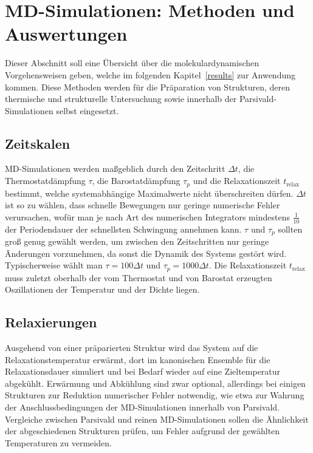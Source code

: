 \section{MD-Simulationen: Methoden und Auswertungen}
\label{mdmethods}

Dieser Abschnitt soll eine Übersicht über die molekulardynamischen Vorgehensweisen geben, welche im folgenden Kapitel~\ref{results} zur Anwendung kommen.
Diese Methoden werden für die Präparation von Strukturen, deren thermische und strukturelle Untersuchung sowie innerhalb der Parsivald-Simulationen selbst eingesetzt.

\subsection{Zeitskalen}

MD-Simulationen werden maßgeblich durch den Zeitschritt $\Delta t$, die Thermostatdämpfung $\tau$, die Barostatdämpfung $\tau_p$ und die Relaxationszeit $t_\text{relax}$ bestimmt, welche systemabhängige Maximalwerte nicht überschreiten dürfen.
$\Delta t$ ist so zu wählen, dass schnelle Bewegungen nur geringe numerische Fehler verursachen, wofür man je nach Art des numerischen Integrators mindestens $\frac{1}{10}$ der Periodendauer der schnellsten Schwingung annehmen kann.
$\tau$ und $\tau_p$ sollten groß genug gewählt werden, um zwischen den Zeitschritten nur geringe Änderungen vorzunehmen, da sonst die Dynamik des Systems gestört wird.
Typischerweise wählt man $\tau = 100 \Delta t$ und  $\tau_p = 1000 \Delta t$.
Die Relaxationszeit $t_\text{relax}$ muss zuletzt oberhalb der vom Thermostat und von Barostat erzeugten Oszillationen der Temperatur und der Dichte liegen.


\subsection{Relaxierungen}

Ausgehend von einer präparierten Struktur wird das System auf die Relaxationstemperatur erwärmt, dort im kanonischen Ensemble für die Relaxationsdauer simuliert und bei Bedarf wieder auf eine Zieltemperatur abgekühlt.
Erwärmung und Abkühlung sind zwar optional, allerdings bei einigen Strukturen zur Reduktion numerischer Fehler notwendig, wie etwa zur Wahrung der Anschlussbedingungen der MD-Simulationen innerhalb von Parsivald.
Vergleiche zwischen Parsivald und reinen MD-Simulationen sollen die Ähnlichkeit der abgeschiedenen Strukturen prüfen, um Fehler aufgrund der gewählten Temperaturen zu vermeiden.

